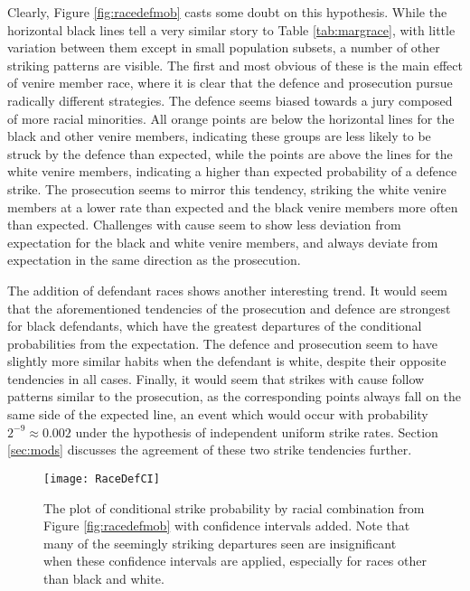 Clearly, Figure \ref{fig:racedefmob} casts some doubt on this hypothesis. While the horizontal black lines tell a very similar
story to Table \ref{tab:margrace}, with little variation between them
except in small population subsets, a number of other
striking patterns are visible. The first and most obvious of these is
the main effect of venire member race, where it is clear that the defence and prosecution pursue
radically different strategies. The defence seems biased towards a jury composed of more racial minorities. All
orange points are below the horizontal lines for the black and other venire members, indicating these groups are less likely to be
struck by the defence than expected, while the points are above the lines for the white venire members, indicating a higher than
expected probability of a defence strike. The prosecution seems to mirror this tendency, striking the
white venire members at a lower rate than expected and the black venire members more often than expected. Challenges with cause
seem to show less deviation from expectation for the black and white venire members, and always deviate from expectation
in the same direction as the prosecution.

The addition of defendant races shows another interesting trend. It would seem that the aforementioned tendencies of the
prosecution and defence are strongest for black defendants, which have the greatest departures of the conditional probabilities
from the expectation. The defence and prosecution seem to have slightly more similar habits when the defendant is white, despite
their opposite tendencies in all cases. Finally, it would seem that strikes with cause follow patterns similar to the
prosecution, as the corresponding points always fall on the 
same side of the expected line, an event which would occur with probability $2^{-9} \approx 0.002$ under the hypothesis of
independent uniform strike rates. Section \ref{sec:mods} discusses the agreement of these two strike tendencies further.

\begin{figure}[h!]
  \centering
  \texttt{[image: RaceDefCI]}
  \caption[Strikes by Racial Combination with Confidence
  Intervals (Sunsine)]{\footnotesize The plot of conditional strike probability by racial
    combination from Figure \ref{fig:racedefmob} with confidence intervals added. Note that many of the seemingly striking departures seen are
    insignificant when these confidence intervals are applied,
    especially for races other than black and white.}
  \label{fig:racedefci}
\end{figure}

